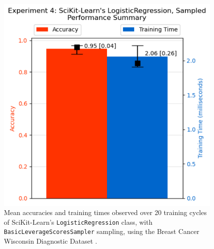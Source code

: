 \documentclass{article}
\theoremstyle{plain}
\theoremstyle{definition}
\theoremstyle{remark}
\begin{document}
\begin{figure}[ht]
\vskip 0.2in
\begin{center}
\centerline{\includegraphics[width=\columnwidth]{experiment_4b}}
\caption{Mean accuracies and training times observed over 20 training cycles of SciKit-Learn's \texttt{LogisticRegression} class, with \texttt{BasicLeverageScoresSampler} sampling, using the Breast Cancer Wisconsin Diagnostic Dataset \cite{breastcancer}.}
\label{experiment_1a}
\end{center}
\vskip -0.2in
\end{figure}
\end{document}
